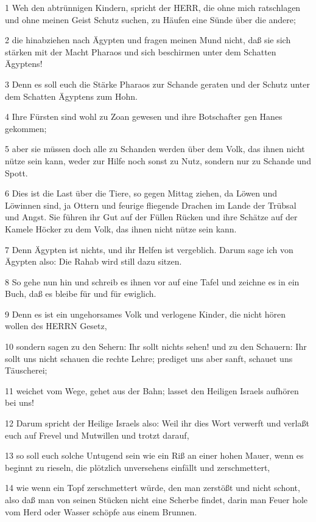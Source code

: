 \par 1 Weh den abtrünnigen Kindern, spricht der HERR, die ohne mich ratschlagen und ohne meinen Geist Schutz suchen, zu Häufen eine Sünde über die andere;
\par 2 die hinabziehen nach Ägypten und fragen meinen Mund nicht, daß sie sich stärken mit der Macht Pharaos und sich beschirmen unter dem Schatten Ägyptens!
\par 3 Denn es soll euch die Stärke Pharaos zur Schande geraten und der Schutz unter dem Schatten Ägyptens zum Hohn.
\par 4 Ihre Fürsten sind wohl zu Zoan gewesen und ihre Botschafter gen Hanes gekommen;
\par 5 aber sie müssen doch alle zu Schanden werden über dem Volk, das ihnen nicht nütze sein kann, weder zur Hilfe noch sonst zu Nutz, sondern nur zu Schande und Spott.
\par 6 Dies ist die Last über die Tiere, so gegen Mittag ziehen, da Löwen und Löwinnen sind, ja Ottern und feurige fliegende Drachen im Lande der Trübsal und Angst. Sie führen ihr Gut auf der Füllen Rücken und ihre Schätze auf der Kamele Höcker zu dem Volk, das ihnen nicht nütze sein kann.
\par 7 Denn Ägypten ist nichts, und ihr Helfen ist vergeblich. Darum sage ich von Ägypten also: Die Rahab wird still dazu sitzen.
\par 8 So gehe nun hin und schreib es ihnen vor auf eine Tafel und zeichne es in ein Buch, daß es bleibe für und für ewiglich.
\par 9 Denn es ist ein ungehorsames Volk und verlogene Kinder, die nicht hören wollen des HERRN Gesetz,
\par 10 sondern sagen zu den Sehern: Ihr sollt nichts sehen! und zu den Schauern: Ihr sollt uns nicht schauen die rechte Lehre; prediget uns aber sanft, schauet uns Täuscherei;
\par 11 weichet vom Wege, gehet aus der Bahn; lasset den Heiligen Israels aufhören bei uns!
\par 12 Darum spricht der Heilige Israels also: Weil ihr dies Wort verwerft und verlaßt euch auf Frevel und Mutwillen und trotzt darauf,
\par 13 so soll euch solche Untugend sein wie ein Riß an einer hohen Mauer, wenn es beginnt zu rieseln, die plötzlich unversehens einfällt und zerschmettert,
\par 14 wie wenn ein Topf zerschmettert würde, den man zerstößt und nicht schont, also daß man von seinen Stücken nicht eine Scherbe findet, darin man Feuer hole vom Herd oder Wasser schöpfe aus einem Brunnen.
